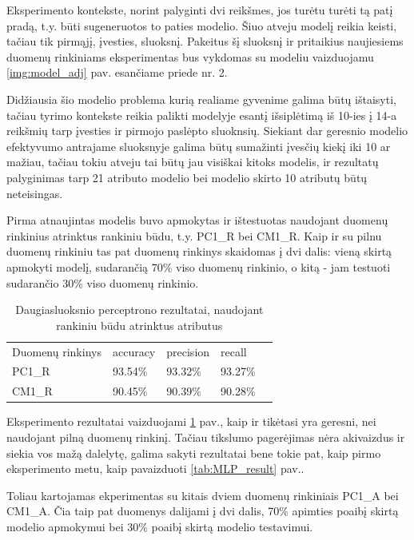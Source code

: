 \documentclass{VUMIFPSbakalaurinis}
\begin{document}
Eksperimento kontekste, norint palyginti dvi reikšmes, jos turėtu turėti tą patį pradą, t.y. būti sugeneruotos to paties modelio. Šiuo atveju modelį reikia keisti, tačiau tik pirmąjį, įvesties, sluoksnį. Pakeitus šį sluoksnį ir pritaikius naujiesiems duomenų rinkiniams eksperimentas bus vykdomas su modeliu vaizduojamu \ref{img:model_adj} pav. esančiame priede nr. 2.

Didžiausia šio modelio problema kurią realiame gyvenime galima būtų ištaisyti, tačiau tyrimo kontekste reikia palikti modelyje esantį išsiplėtimą iš 10-ies į 14-a reikšmių tarp įvesties ir pirmojo paslėpto sluoknsių. Siekiant dar geresnio modelio efektyvumo antrajame sluoksnyje galima būtų sumažinti įvesčių kiekį iki 10 ar mažiau, tačiau tokiu atveju tai būtų jau visiškai kitoks modelis, ir rezultatų palyginimas tarp 21 atributo modelio bei modelio skirto 10 atributų būtų neteisingas.

Pirma atnaujintas modelis buvo apmokytas ir ištestuotas naudojant duomenų rinkinius atrinktus rankiniu būdu, t.y. PC1\_R bei CM1\_R. Kaip ir su pilnu duomenų rinkiniu tas pat duomenų rinkinys skaidomas į dvi dalis: vieną skirtą apmokyti modelį, sudarančią 70\% viso duomenų rinkinio, o kitą - jam testuoti sudarančio 30\% viso duomenų rinkinio.

\begin{table}[H]\footnotesize
\centering
\caption{Daugiasluoksnio perceptrono rezultatai, naudojant rankiniu būdu atrinktus atributus}
\label{tab:MLP_result_1}
\begin{tabular}{lllll}
\cline{1-4}
\multicolumn{1}{|l}{Duomenų rinkinys} & accuracy & precision & \multicolumn{1}{l|}{recall} &  \\ \cline{1-4}
\multicolumn{1}{|l}{PC1\_R}              & 93.54\%   &93.32\%     & \multicolumn{1}{l|}{93.27\%} &  \\
\multicolumn{1}{|l}{CM1\_R}              & 90.45\%    & 90.39\%     & \multicolumn{1}{l|}{90.28\%}  &  \\ \cline{1-4}
\end{tabular}
\end{table}

Eksperimento rezultatai vaizduojami \ref{tab:MLP_result_1} pav., kaip ir tikėtasi yra geresni, nei naudojant pilną duomenų rinkinį. Tačiau tikslumo pagerėjimas nėra akivaizdus ir siekia vos mažą dalelytę, galima sakyti rezultatai bene tokie pat, kaip pirmo eksperimento metu, kaip pavaizduoti \ref{tab:MLP_result} pav..

Toliau kartojamas ekperimentas su kitais dviem duomenų rinkiniais PC1\_A bei CM1\_A. Čia taip pat duomenys dalijami į dvi dalis, 70\% apimties poaibį skirtą modelio apmokymui bei 30\% poaibį skirtą modelio testavimui.
\end{document}
